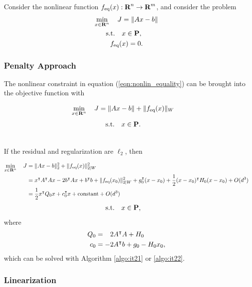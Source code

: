 \documentclass{article}
\begin{document}
    Consider the nonlinear function $f_{\text{eq}}(x):\textbf{R}^n\to\textbf{R}^m$,
    and consider the problem
    \begin{align}
        \min_{x\in\textbf{R}^n} \quad J &= \|Ax-b\|\label{eqn:nonlin_equality}\\
        \text{s.t.} \quad &x\in\textbf{P},\nonumber\\
        f_{\text{eq}}(&x)=0.\nonumber
    \end{align}

\subsubsection{Penalty Approach}

    The nonlinear constraint in equation (\ref{eqn:nonlin_equality}) can be brought into the objective function with
    
    \begin{align*}
        \min_{x\in\textbf{R}^n} \quad J &= \|Ax-b\|+\|f_{\text{eq}}(x)\|_W
    \end{align*}
    \begin{align*}
        \text{s.t.} \quad &x\in\textbf{P}.
    \end{align*}

    \\
    If the residual and regularization are $\ell_2$, then

    \begin{align*}
        \min_{x\in\textbf{R}^n} \quad J &= \|Ax-b\|_2^2+\|f_{\text{eq}}(x)\|_{2|W}^2\\
        &=x^\intercal A^\intercal A x -2 b^\intercal Ax +b^\intercal b+\|f_{\text{eq}}(x_0)\|_{2|W}^2 + g_0^\intercal(x-x_0)+\frac{1}{2} (x-x_0)^\intercal H_0 (x-x_0)+ O(d^3)\\
        & = \frac{1}{2} x^\intercal Q_0 x +c_0^\intercal x +\text{constant} + O(d^3)
    \end{align*}
    \begin{align*}
        \text{s.t.} \quad x&\in\textbf{P},
    \end{align*}
    where
    \begin{align*}
        Q_0&=\minus2A^\tp A + H_0\\
        c_0&=-2A^\tp b+g_0-H_0x_0,
    \end{align*}
    which can be solved with Algorithm \ref{algo:it21} or \ref{algo:it22}.

\subsubsection{Linearization}
\end{document}
